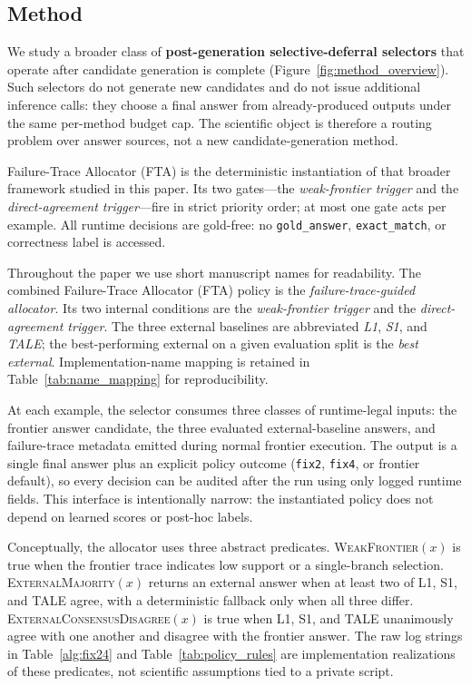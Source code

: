 \subsection{Method}
\label{sec:method}

We study a broader class of \textbf{post-generation selective-deferral selectors}
that operate after candidate generation is complete (Figure~\ref{fig:method_overview}).
Such selectors do not generate new candidates and do not issue additional
inference calls: they choose a final answer from already-produced outputs under
the same per-method budget cap. The scientific object is therefore a routing
problem over answer sources, not a new candidate-generation method.

Failure-Trace Allocator (FTA) is the deterministic instantiation of that broader
framework studied in this paper. Its two gates---the \textit{weak-frontier trigger}
and the \textit{direct-agreement trigger}---fire in strict priority order; at
most one gate acts per example. All runtime decisions are gold-free: no
\texttt{gold\_answer}, \texttt{exact\_match}, or correctness label is accessed.

Throughout the paper we use short manuscript names for readability.
The combined Failure-Trace Allocator (FTA) policy is the \emph{failure-trace-guided allocator}.
Its two internal conditions are the \emph{weak-frontier trigger} and the \emph{direct-agreement trigger}.
The three external baselines are abbreviated \emph{L1}, \emph{S1}, and \emph{TALE}; the best-performing external on a given evaluation split is the \emph{best external}.
Implementation-name mapping is retained in Table~\ref{tab:name_mapping} for reproducibility.

At each example, the selector consumes three classes of runtime-legal inputs: the
frontier answer candidate, the three evaluated external-baseline answers, and
failure-trace metadata emitted during normal frontier execution. The output is a
single final answer plus an explicit policy outcome
(\texttt{fix2}, \texttt{fix4}, or frontier default), so every decision can be
audited after the run using only logged runtime fields.
This interface is intentionally narrow: the instantiated policy does not depend on
learned scores or post-hoc labels.

Conceptually, the allocator uses three abstract predicates.
\textsc{WeakFrontier}$(x)$ is true when the frontier trace indicates low support
or a single-branch selection.
\textsc{ExternalMajority}$(x)$ returns an external answer when at least two of
L1, S1, and TALE agree, with a deterministic fallback only when all three differ.
\textsc{ExternalConsensusDisagree}$(x)$ is true when L1, S1, and TALE unanimously
agree with one another and disagree with the frontier answer.
The raw log strings in Table~\ref{alg:fix24} and Table~\ref{tab:policy_rules}
are implementation realizations of these predicates, not scientific assumptions
tied to a private script.

